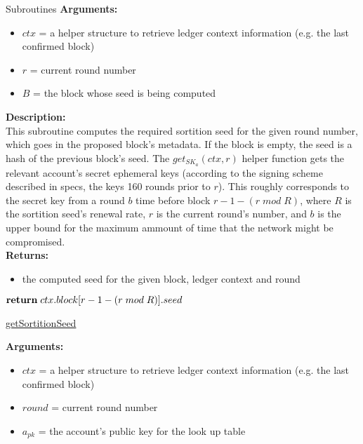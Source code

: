 \documentclass[10pt,a4paper]{article}
\begin{document}
\begin{section}{Subroutines}
\noindent \textbf{Arguments:}
\begin{itemize}
    \item $ctx$ = a helper structure to retrieve ledger context information (e.g. the last confirmed block)
    \item $r$ = current round number
    \item $B$ = the block whose seed is being computed
  \end{itemize}


\noindent \textbf{Description:}\\
This subroutine computes the required sortition seed for the given round number, 
which goes in the proposed block's metadata.
If the block is empty, the seed is a hash of the previous block's seed.
The $get_{SK_a}(ctx, r)$ helper function gets the relevant account's secret ephemeral keys (according to the signing scheme described in specs, the keys 160 rounds prior to $r$).
This roughly corresponds to the secret key from a round $b$ time before block $r-1-(r\;mod\;R)$, where $R$ is the sortition seed's renewal rate, $r$ is the current round's number,
and $b$ is the upper bound for the maximum ammount of time that the network might be compromised.\\

\noindent \textbf{Returns:}
\begin{itemize}
    \item the computed seed for the given block, ledger context and round
  \end{itemize}


\begin{algorithm}[H]
    \begin{algorithmic}[1]
        
            $\Return\;ctx.block[r-1-(r\;mod\;R)].seed$

        \EndFunction
    \end{algorithmic}
    \caption{\underline{getSortitionSeed}}
\end{algorithm}

\noindent \textbf{Arguments:}
\begin{itemize}
    \item $ctx$ = a helper structure to retrieve ledger context information (e.g. the last confirmed block)
    \item $round$ = current round number
    \item $a_{pk}$ = the account's public key for the look up table
  \end{itemize}



\end{section}
\end{document}
